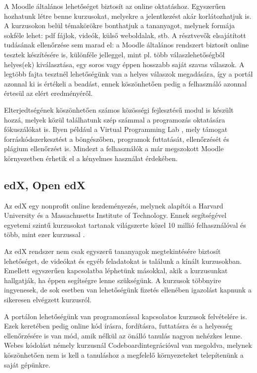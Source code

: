 A Moodle általános lehetőséget biztosít az online oktatáshoz. Egyszerűen hozhatunk létre benne kurzusokat, melyekre a jelentkezést akár korlátozhatjuk is. A kurzusokon belül témakörökre bonthatjuk a tananyagot, melynek formája sokféle lehet: pdf fájlok, videók, külső weboldalak, stb. A résztvevők elsajátított tudásának ellenőrzése sem marad el: a Moodle általános rendszert biztosít online tesztek készítésére is, különféle jelleggel, mint pl. több válaszlehetőségből helyes(ek) kiválasztása, egy soros vagy éppen hosszabb saját szavas válaszok. A legtöbb fajta tesztnél lehetőségünk van a helyes válaszok megadására, így a portál azonnal ki is értékeli a beadást, ennek köszönhetően pedig a felhasználó azonnal értesül az elért eredményéről.

Elterjedtségének köszönhetően számos közösségi fejlesztésű modul is készült hozzá, melyek közül találhatunk szép számmal a programozás oktatására fókuszálókat is. Ilyen például a Virtual Programming Lab \cite{VPL} \cite{VPLJournal}, mely támogat forráskódszerkesztést a böngészőben, programok futtatását, ellenőrzését és plágium ellenőrzést is. Mindezt a felhasználók a már megszokott Moodle környezetben érhetik el a kényelmes használat érdekében.

\subsection*{edX, Open edX}
Az edX \cite{EDXAbout} egy nonprofit online kezdeményezés, melynek alapítói a Harvard University és a Massachusetts Institute of Technology. Ennek segítségével egyetemi szintű kurzusokat tartanak világszerte közel 10 millió felhasználóval és több, mint ezer kurzussal \cite{EDXReview}.

Az edX rendszer nem csak egyszerű tananyagok megtekintésére biztosít lehetőséget, de videókat és egyéb feladatokat is találunk a kínált kurzusokban. Emellett egyszerűen kapcsolatba léphetünk másokkal, akik a kurzusunkat hallgatják, ha éppen segítségre lenne szükségünk. A kurzusok többnyire ingyenesek, de sok esetben van lehetőségünk fizetés ellenében igazolást kapnunk a sikeresen elvégzett kurzusról.

A portálon lehetőségünk van programozással kapcsolatos kurzusok felvételére is. Ezek keretében pedig online kód írásra, fordításra, futtatásra és a helyesség ellenőrzésére is van mód, amik nélkül az önálló tanulás nagyon nehézkes lenne. Webes kódolást némely kurzusnál Codeboard\footnotemark integrációval van megoldva, melynek köszönhetően nem is kell a tanuláshoz a megfelelő környezeteket telepítenünk a saját gépünkre.

